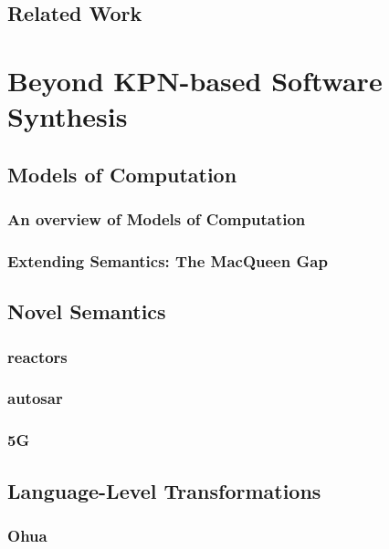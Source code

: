 \documentclass{report}
\begin{document}
\chapter{Related Work}



\part{Beyond KPN-based Software Synthesis}


\chapter{Models of Computation}
\label{chap:mocs}

\section{An overview of Models of Computation}

\section{Extending Semantics: The MacQueen Gap} %

\chapter{Novel Semantics}

\section{reactors}
\section{autosar}
\section{5G}

\chapter{Language-Level Transformations}
\section{Ohua}
 
\end{document}
